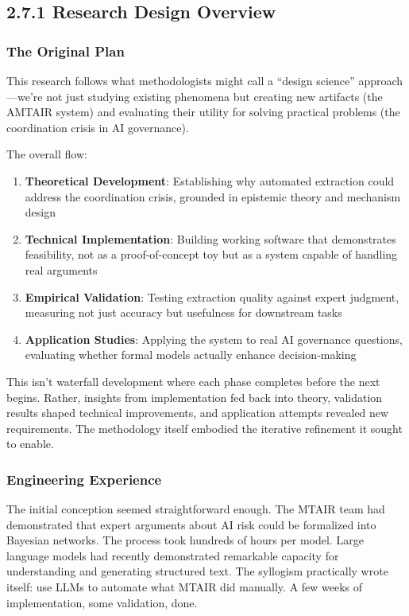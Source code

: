 \documentclass[
  11pt,
  letterpaper,
  openany]{book}
\providecommand{\tightlist}{%
  \setlength{\itemsep}{0pt}\setlength{\parskip}{0pt}}
\begin{document}
\subsection{2.7.1 Research Design Overview}\label{sec-research-design}

\subsubsection{The Original Plan}\label{the-original-plan}

This research follows what methodologists might call a ``design
science'' approach---we're not just studying existing phenomena but
creating new artifacts (the AMTAIR system) and evaluating their utility
for solving practical problems (the coordination crisis in AI
governance).

The overall flow:

\begin{enumerate}
\def\labelenumi{\arabic{enumi}.}
\tightlist
\item
  \textbf{Theoretical Development}: Establishing why automated
  extraction could address the coordination crisis, grounded in
  epistemic theory and mechanism design
\item
  \textbf{Technical Implementation}: Building working software that
  demonstrates feasibility, not as a proof-of-concept toy but as a
  system capable of handling real arguments
\item
  \textbf{Empirical Validation}: Testing extraction quality against
  expert judgment, measuring not just accuracy but usefulness for
  downstream tasks
\item
  \textbf{Application Studies}: Applying the system to real AI
  governance questions, evaluating whether formal models actually
  enhance decision-making
\end{enumerate}

This isn't waterfall development where each phase completes before the
next begins. Rather, insights from implementation fed back into theory,
validation results shaped technical improvements, and application
attempts revealed new requirements. The methodology itself embodied the
iterative refinement it sought to enable.

\subsubsection{Engineering Experience}\label{engineering-experience}

The initial conception seemed straightforward enough. The MTAIR team had
demonstrated that expert arguments about AI risk could be formalized
into Bayesian networks. The process took hundreds of hours per model.
Large language models had recently demonstrated remarkable capacity for
understanding and generating structured text. The syllogism practically
wrote itself: use LLMs to automate what MTAIR did manually. A few weeks
of implementation, some validation, done.
\end{document}

